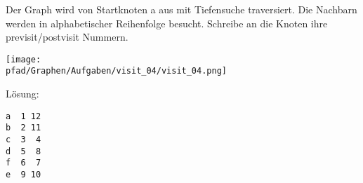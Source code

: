 \question[3]
Der Graph wird von Startknoten a aus mit Tiefensuche traversiert. Die
  Nachbarn werden in alphabetischer Reihenfolge besucht.
  Schreibe an die Knoten ihre previsit/postvisit Nummern.

\texttt{[image: \\pfad/Graphen/Aufgaben/visit\_04/visit\_04.png]}

\ifprintanswers
Lösung:
\begin{lstlisting}
a  1 12
b  2 11
c  3  4
d  5  8
f  6  7
e  9 10
\end{lstlisting}
\fi
